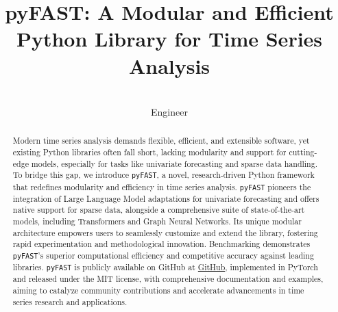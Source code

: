 \documentclass{article}
\title{pyFAST: A Modular and Efficient Python Library for Time Series Analysis}
\author{\Name{Cline} \Email{cline@example.com} \\
       \addrSoftware Engineer}
\begin{document}
\maketitle

\begin{abstract}
Modern time series analysis demands flexible, efficient, and extensible software, yet existing Python libraries often fall short, lacking modularity and support for cutting-edge models, especially for tasks like univariate forecasting and sparse data handling. To bridge this gap, we introduce \texttt{pyFAST}, a novel, research-driven Python framework that redefines modularity and efficiency in time series analysis.  \texttt{pyFAST} pioneers the integration of Large Language Model adaptations for univariate forecasting and offers native support for sparse data, alongside a comprehensive suite of state-of-the-art models, including Transformers and Graph Neural Networks.  Its unique modular architecture empowers users to seamlessly customize and extend the library, fostering rapid experimentation and methodological innovation. Benchmarking demonstrates \texttt{pyFAST}'s superior computational efficiency and competitive accuracy against leading libraries. \texttt{pyFAST} is publicly available on GitHub at \href{https://github.com/anonymous-code-for-peer-review/pyFAST}{GitHub}, implemented in PyTorch and released under the MIT license, with comprehensive documentation and examples, aiming to catalyze community contributions and accelerate advancements in time series research and applications.
\end{abstract}
\end{document}
